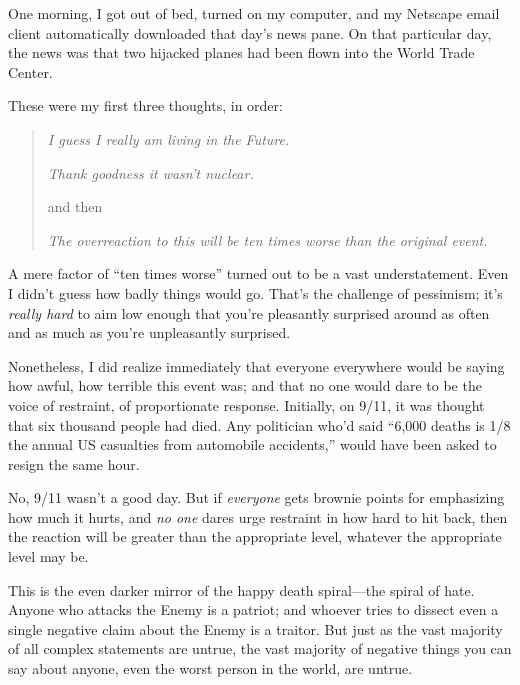 \myendsectiontext


\bigskip


{
 One morning, I got out of bed, turned on my computer, and my
Netscape email client automatically downloaded that
day's news pane. On that particular day, the news was
that two hijacked planes had been flown into the World Trade Center. }

{
 These were my first three thoughts, in order:}

\begin{quote}
{
 \textit{I guess I really am living in the Future.}}

{
 \textit{Thank goodness it wasn't nuclear.}}

{
 and then}

{
 \textit{The overreaction to this will be ten times worse than the
   original event.}}
\end{quote}

{
 A mere factor of ``ten times
worse'' turned out to be a vast understatement. Even
I didn't guess how badly things would go.
That's the challenge of pessimism; it's
\textit{really hard} to aim low enough that you're
pleasantly surprised around as often and as much as
you're unpleasantly surprised.}

{
 Nonetheless, I did realize immediately that everyone everywhere
would be saying how awful, how terrible this event was; and that no one
would dare to be the voice of restraint, of proportionate response.
Initially, on 9/11, it was thought that six thousand people had died.
Any politician who'd said ``6,000
deaths is 1/8 the annual US casualties from automobile
accidents,'' would have been asked to resign the same
hour.}

{
 No, 9/11 wasn't a good day. But if
\textit{everyone} gets brownie points for emphasizing how much it
hurts, and \textit{no one} dares urge restraint in how hard to hit
back, then the reaction will be greater than the appropriate level,
whatever the appropriate level may be.}

{
 This is the even darker mirror of the happy death spiral---the
spiral of hate. Anyone who attacks the Enemy is a patriot; and whoever
tries to dissect even a single negative claim about the Enemy is a
traitor. But just as the vast majority of all complex statements are
untrue, the vast majority of negative things you can say about anyone,
even the worst person in the world, are untrue.}

